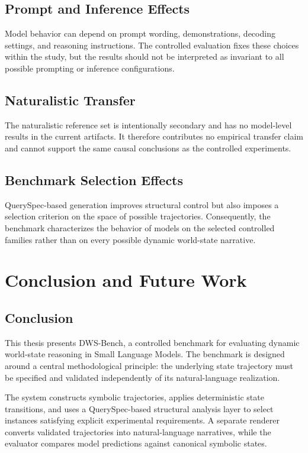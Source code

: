 \documentclass{iutbscthesis}
\begin{document}
\section{Prompt and Inference Effects}
Model behavior can depend on prompt wording, demonstrations, decoding settings, and reasoning
instructions. The controlled evaluation fixes these choices within the study, but the results should
not be interpreted as invariant to all possible prompting or inference configurations.

\section{Naturalistic Transfer}
The naturalistic reference set is intentionally secondary and has no model-level results in the current
artifacts. It therefore contributes no empirical transfer claim and cannot support the same causal
conclusions as the controlled experiments.

\section{Benchmark Selection Effects}
QuerySpec-based generation improves structural control but also imposes a selection criterion on the
space of possible trajectories. Consequently, the benchmark characterizes the behavior of models on
the selected controlled families rather than on every possible dynamic world-state narrative.

\chapter{Conclusion and Future Work}
\section{Conclusion}
This thesis presents DWS-Bench, a controlled benchmark for evaluating dynamic world-state reasoning in
Small Language Models. The benchmark is designed around a central methodological principle: the
underlying state trajectory must be specified and validated independently of its natural-language
realization.

The system constructs symbolic trajectories, applies deterministic state transitions, and uses a
QuerySpec-based structural analysis layer to select instances satisfying explicit experimental
requirements. A separate renderer converts validated trajectories into natural-language narratives,
while the evaluator compares model predictions against canonical symbolic states.
\end{document}
